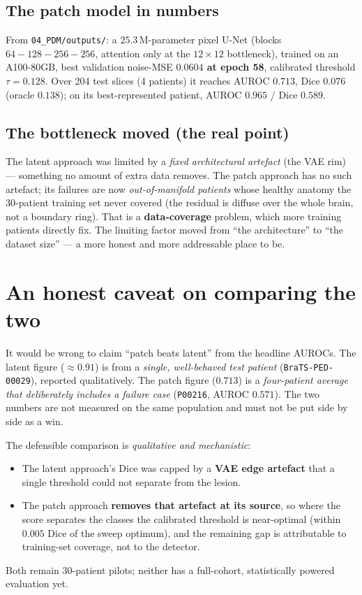 \documentclass[11pt,a4paper]{article}
\newcommand{\code}[1]{\texttt{\small #1}}
\begin{document}
\subsection{The patch model in numbers}
From \code{04\_PDM/outputs/}: a $25.3$\,M-parameter pixel U-Net (blocks
$64{-}128{-}256{-}256$, attention only at the $12\times12$ bottleneck), trained on
an A100-80GB, best validation noise-MSE \textbf{$0.0604$ at epoch 58},
calibrated threshold $\tau=0.128$. Over 204 test slices (4 patients) it reaches
AUROC $0.713$, Dice $0.076$ (oracle $0.138$); on its best-represented patient,
AUROC $0.965$ / Dice $0.589$.

\subsection{The bottleneck moved (the real point)}
The latent approach was limited by a \emph{fixed architectural artefact} (the
VAE rim) --- something no amount of extra data removes. The patch approach has no
such artefact; its failures are now \emph{out-of-manifold patients} whose healthy
anatomy the 30-patient training set never covered (the residual is diffuse over
the whole brain, not a boundary ring). That is a \textbf{data-coverage} problem,
which more training patients directly fix. The limiting factor moved from
``the architecture'' to ``the dataset size'' --- a more honest and more
addressable place to be.

\section{An honest caveat on comparing the two}
It would be wrong to claim ``patch beats latent'' from the headline AUROCs. The
latent figure ($\approx0.91$) is from a \emph{single, well-behaved test patient}
(\code{BraTS-PED-00029}), reported qualitatively. The patch figure ($0.713$) is a
\emph{four-patient average that deliberately includes a failure case}
(\code{P00216}, AUROC $0.571$). The two numbers are not measured on the same
population and must not be put side by side as a win.

The defensible comparison is \emph{qualitative and mechanistic}:
\begin{itemize}[leftmargin=1.4em,itemsep=0pt]
\item The latent approach's Dice was capped by a \textbf{VAE edge artefact} that a
single threshold could not separate from the lesion.
\item The patch approach \textbf{removes that artefact at its source}, so where
the score separates the classes the calibrated threshold is near-optimal (within
$0.005$ Dice of the sweep optimum), and the remaining gap is attributable to
training-set coverage, not to the detector.
\end{itemize}
Both remain 30-patient pilots; neither has a full-cohort, statistically powered
evaluation yet.
\end{document}

